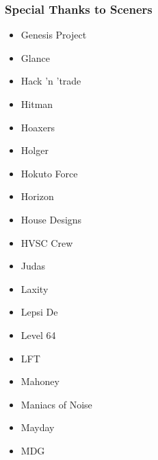 \begin{frame}[noframenumbering]
\frametitle{Special Thanks to Sceners}

\begin{multicols}{3}
\begin{itemize}
\item Genesis Project
\item Glance
\item Hack 'n 'trade
\item Hitman
\item Hoaxers
\item Holger
\item Hokuto Force
\item Horizon
\item House Designs
\item HVSC Crew
\item Judas
\item Laxity
\item Lepsi De
\item Level 64
\item LFT
\item Mahoney
\item Maniacs of Noise
\item Mayday
\item MDG
\end{itemize}
\end{multicols}

\end{frame}



